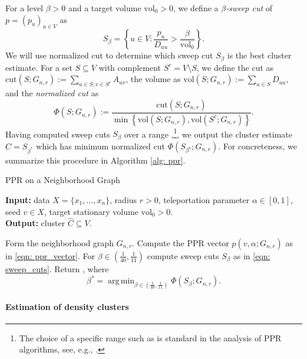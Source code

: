 \documentclass{article}
\newcommand{\set}[1]{\left\{#1\right\}}
\newcommand{\vol}{\mathrm{vol}}
\newcommand{\cut}{\mathrm{cut}}
\newcommand{\1}{\mathbf{1}}
\newcommand{\pbf}{p}        %
\newcommand{\Abf}{A}
\newcommand{\Xbf}{X}             %
\newcommand{\Dbf}{D}
\newcommand{\Cest}{\widehat{C}}
\DeclareMathOperator*{\argmin}{arg\,min}
\theoremstyle{aldenthm}
\theoremstyle{aldenrmrk}
\begin{document}
For a level $\beta > 0$ and a target volume $\vol_0 > 0$, we define a
\emph{$\beta$-sweep cut} of $\pbf = (p_u)_{u \in V}$ as  
\begin{equation}
\label{eqn: sweep_cuts}
S_\beta = \set{u \in V: \frac{p_u}{\Dbf_{uu}} > \frac{\beta}{\vol_{0}}}.
\end{equation}
We will use normalized cut to determine which sweep cut $S_{\beta}$ is the best cluster estimate. For a set $S \subseteq V$ with complement $S^c = V \setminus S$, we define the cut as $\cut(S;G_{n,r}) := \sum_{u \in S, v \in S^c} \Abf_{uv}$, the volume as $\vol(S; G_{n,r}) := \sum_{u \in S} \Dbf_{uu}$, and the \emph{normalized cut} as
\begin{equation}
\label{eqn: normalized_cut}
\Phi(S; G_{n,r}) := \frac{\cut(S;G_{n,r})}{\min \set{\vol(S; G_{n,r}), \vol(S^c; G_{n,r})}}.
\end{equation}
Having computed sweep cuts $S_{\beta}$ over a range ,\footnote{The choice of a specific range such as 
 is standard in the analysis of PPR
algorithms, see, e.g., \citep{zhu2013}.}, we output the cluster estimate $\widehat{C} = S_{\beta^*}$ which has minimum normalized cut $\Phi(S_{\beta^{\star}}; G_{n,r})$. For concreteness, we summarize this procedure in Algorithm \ref{alg: ppr}.

\begin{algorithm}
	\caption{PPR on a Neighborhood Graph}
	\label{alg: ppr}	
	{\bfseries Input:} data $\Xbf=\{x_1,\ldots,x_n\}$, radius $r > 0$, teleportation 
	parameter $\alpha \in [0,1]$, seed $v \in \Xbf$, target stationary volume $\vol_0 >
	0$. \\   
	{\bfseries Output:} cluster $\Cest \subseteq V$.
	\begin{algorithmic}[1]
		\STATE Form the neighborhood graph $G_{n,r}$.
		\STATE Compute the PPR vector $\pbf(v, \alpha; G_{n,r})$ as in \eqref{eqn:
			ppr_vector}. 
		\STATE For $\beta \in (\frac{1}{40}, \frac{1}{11})$ compute sweep cuts
		$S_{\beta}$ as in \eqref{eqn: sweep_cuts}.
		\STATE Return \smash{$\Cest = S_{\beta^*}$}, where 
		$$
		\beta^* = \argmin_{\beta \in (\frac{1}{40}, \frac{1}{11})} \Phi(S_{\beta}; G_{n,r}).
		$$
	\end{algorithmic}
\end{algorithm}

\paragraph{Estimation of density clusters}
\end{document}
